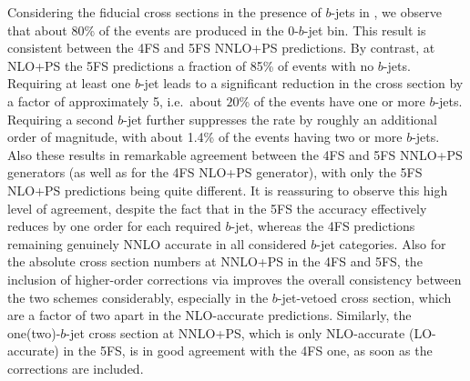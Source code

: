 \documentclass[11pt,a4paper]{article}
\begin{document}
Considering the fiducial cross sections in the presence of $b$-jets in , we observe that about 80\% of the events 
are produced in the $0$-$b$-jet bin. This result is consistent between the 4FS and 5FS NNLO+PS predictions. By contrast, at NLO+PS 
the 5FS predictions a fraction of 85\% of events with no $b$-jets. Requiring at least one $b$-jet leads to a significant reduction in the cross section by a factor 
of approximately 5, i.e.\ about $20$\% of the events have one or more $b$-jets. Requiring a second $b$-jet further suppresses the rate by roughly 
an additional order of magnitude, with about 1.4\% of the \bbH{} events having two or more $b$-jets.
Also these results in remarkable agreement between the 4FS and 5FS NNLO+PS generators (as well as for the 4FS NLO+PS generator), 
with only the 5FS NLO+PS predictions being quite different. It is reassuring to observe this high level of agreement, despite the fact that 
in the 5FS the accuracy effectively reduces by one order for each required $b$-jet, whereas the 4FS predictions remaining genuinely 
NNLO accurate in all considered $b$-jet categories.
Also for the absolute cross section numbers at NNLO+PS in the 4FS and 5FS, the inclusion of higher-order corrections 
via \minnlo{} improves the overall consistency between the two schemes considerably, especially in the $b$-jet-vetoed cross section,
which are a factor of two apart in the NLO-accurate predictions. Similarly, the one(two)-$b$-jet cross section at NNLO+PS, which is only NLO-accurate (LO-accurate) in the 5FS, 
is in good agreement with the 4FS one, as soon as the \minnlo{} corrections are included.
\end{document}
